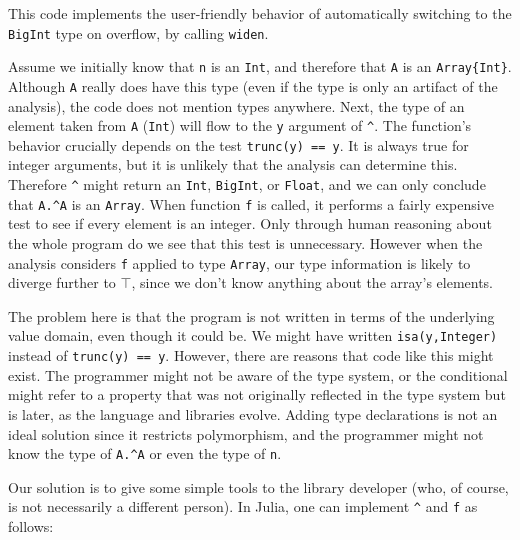 \noindent
This code implements the user-friendly behavior of automatically switching to the
\texttt{BigInt} type on overflow, by calling \texttt{widen}.

Assume we initially know that \texttt{n} is an \texttt{Int}, and therefore
that \texttt{A} is an \texttt{Array\{Int\}}.
Although \texttt{A} really does have this type (even if the
type is only an artifact of the analysis), the code does not mention
types anywhere.
Next, the type of an element taken from \texttt{A} (\texttt{Int}) will
flow to the \texttt{y} argument of \texttt{\^}.
The function's behavior crucially depends on the test \texttt{trunc(y) == y}.
It is always true for integer arguments, but it is unlikely that the
analysis can determine this.
Therefore \texttt{\^} might return an \texttt{Int}, \texttt{BigInt}, or
\texttt{Float}, and we can only conclude that \texttt{A.\^{}A} is an
\texttt{Array}.
When function \texttt{f} is called, it performs a fairly expensive test
to see if every element is an integer.
Only through human reasoning about the whole program do we see that
this test is unnecessary.
However when the analysis considers \texttt{f} applied to type
\texttt{Array}, our type information is likely to diverge further to
\texttt{$\top$}, since we don't know anything about the array's elements.

The problem here is that the program is not written in terms of the
underlying value domain, even though it could be.
We might have written \texttt{isa(y,Integer)} instead of \texttt{trunc(y) == y}.
However, there are reasons that code like this might exist.
The programmer might not be aware of the type system, or the conditional
might refer to a property that was not originally reflected in the type system
but is later, as the language and libraries evolve.
Adding type declarations is not an ideal solution since it restricts
polymorphism, and the programmer might not know the type of \texttt{A.\^{}A}
or even the type of \texttt{n}.


\iffalse
How can we fix this?
One solution is to add type annotations.
But the author of the original code does not know the type of
\texttt{A.\^{}A}, and might not even know the type of \texttt{n}.
Another solution is to improve the analysis.
But we will never finish adding cases to the compiler.
Perhaps we can handle \texttt{trunc(y) == y}, but will we also be
able to understand \texttt{trunc(y) == 1*y}?
\fi

Our solution is to give some simple tools to the library developer
(who, of course, is not necessarily a different person).
In Julia, one can implement \texttt{\^} and \texttt{f} as follows:

